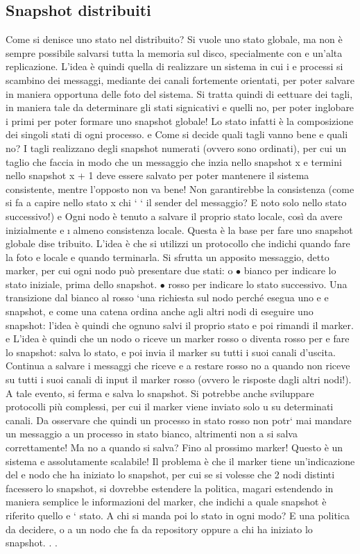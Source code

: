 \subsection{Snapshot distribuiti}
Come si denisce uno stato nel distribuito? Si vuole uno stato globale, ma
non è sempre possibile salvarsi tutta la memoria sul disco, specialmente con
e
un'alta replicazione. L'idea è quindi quella di realizzare un sistema in cui i
e
processi si scambino dei messaggi, mediante dei canali fortemente orientati, per
poter salvare in maniera opportuna delle foto del sistema. Si tratta quindi di
eettuare dei tagli, in maniera tale da determinare gli stati signicativi e quelli
no, per poter inglobare i primi per poter formare uno snapshot globale! Lo stato
infatti è la composizione dei singoli stati di ogni processo.
e
Come si decide quali tagli vanno bene e quali no? I tagli realizzano degli
snapshot numerati (ovvero sono ordinati), per cui un taglio che faccia in modo
che un messaggio che inzia nello snapshot x e termini nello snapshot x + 1 deve
essere salvato per poter mantenere il sistema consistente, mentre l'opposto non
va bene! Non garantirebbe la consistenza (come si fa a capire nello stato x chi
`
` il sender del messaggio? E noto solo nello stato successivo!)
e
Ogni nodo è tenuto a salvare il proprio stato locale, così da avere inizialmente
e
\i{}
almeno consistenza locale. Questa è la base per fare uno snapshot globale dise
tribuito. L'idea è che si utilizzi un protocollo che indichi quando fare la foto
e
locale e quando terminarla. Si sfrutta un apposito messaggio, detto marker, per
cui ogni nodo può presentare due stati:
o
$\bullet$ bianco per indicare lo stato iniziale, prima dello snapshot.
$\bullet$ rosso per indicare lo stato successivo.
Una transizione dal bianco al rosso `una richiesta sul nodo perché esegua uno
e
e
snapshot, e come una catena ordina anche agli altri nodi di eseguire uno snapshot: l'idea è quindi che ognuno salvi il
proprio stato e poi rimandi il marker.
e
L'idea è quindi che un nodo o riceve un marker rosso o diventa rosso per
e
fare lo snapshot: salva lo stato, e poi invia il marker su tutti i suoi canali
d'uscita. Continua a salvare i messaggi che riceve e a restare rosso no a quando
non riceve su tutti i suoi canali di input il marker rosso (ovvero le risposte
dagli altri nodi!). A tale evento, si ferma e salva lo snapshot. Si potrebbe
anche sviluppare protocolli più complessi, per cui il marker viene inviato solo
u
su determinati canali. Da osservare che quindi un processo in stato rosso non
potr` mai mandare un messaggio a un processo in stato bianco, altrimenti non
a
si salva correttamente!
Ma no a quando si salva? Fino al prossimo marker! Questo è un sistema
e
assolutamente scalabile! Il problema è che il marker tiene un'indicazione del
e
nodo che ha iniziato lo snapshot, per cui se si volesse che 2 nodi distinti facessero
lo snapshot, si dovrebbe estendere la politica, magari estendendo in maniera
semplice le informazioni del marker, che indichi a quale snapshot è riferito quello
e
`
stato. A chi si manda poi lo stato in ogni modo? E una politica da decidere, o
a un nodo che fa da repository oppure a chi ha iniziato lo snapshot. . .